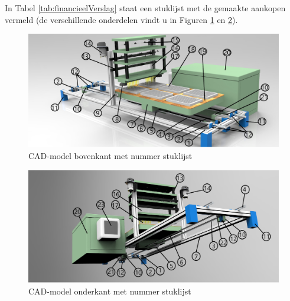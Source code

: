 \documentclass[a4paper,twoside,kulak]{kulakreport} %
\begin{document}
In Tabel \ref{tab:financieelVerslag} staat een stuklijst met de gemaakte aankopen vermeld (de verschillende onderdelen vindt u in Figuren \ref{fig: renderingBovenkantStuklijst} en \ref{fig: renderingOnderkantStuklijst}). 


\begin{figure}[h]
	\centering
	\includegraphics[width=\textwidth]{renderingBovenaanStuklijst.png}
	\caption{CAD-model bovenkant met nummer stuklijst}
	\label{fig: renderingBovenkantStuklijst}
	
\end{figure} 

\begin{figure}[h]
	\centering
	\includegraphics[width=\textwidth]{renderingOnderaanStuklijst.png}
	\caption{CAD-model onderkant met nummer stuklijst}
	\label{fig: renderingOnderkantStuklijst}
	
\end{figure} 

		
\end{document}
